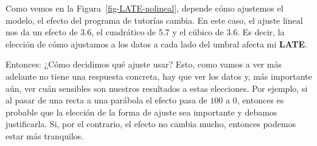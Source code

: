 \documentclass[
  letterpaper,
  DIV=11,
  numbers=noendperiod,
  oneside]{scrreprt}
\begin{document}
Como vemos en la Figura~\ref{fig-LATE-nolineal}, depende cómo ajustemos
el modelo, el efecto del programa de tutorías cambia. En este caso, el
ajuste lineal nos da un efecto de 3.6, el cuadrático de 5.7 y el cúbico
de 3.6. Es decir, la elección de cómo ajustamos a los datos a cada lado
del umbral afecta mi \textbf{LATE}.

Entonces: ¿Cómo decidimos qué ajuste usar? Esto, como vamos a ver más
adelante no tiene una respuesta concreta, hay que ver los datos y, más
importante aún, ver cuán sensibles son nuestros resultados a estas
elecciones. Por ejemplo, si al pasar de una recta a una parábola el
efecto pasa de \(100\) a \(0\), entonces es probable que la elección de
la forma de ajuste sea importante y debamos justificarla. Si, por el
contrario, el efecto no cambia mucho, entonces podemos estar más
tranquilos.
\end{document}
